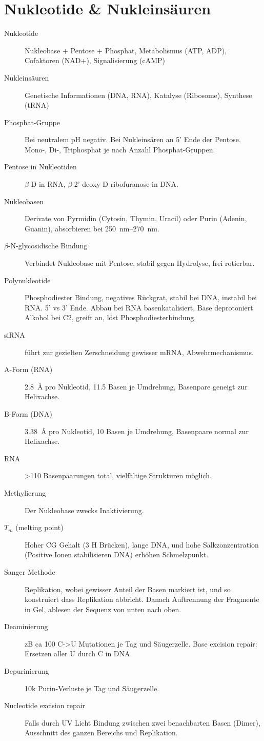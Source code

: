 \documentclass[a4paper,twocolumn,english,fontsize=7,DIV=16]{scrartcl}
\begin{document}
\section{Nukleotide \& Nukleinsäuren}

\begin{description}
	\item[Nukleotide] Nukleobase + Pentose + Phosphat, Metabolismus (ATP, ADP), Cofaktoren (NAD+), Signalisierung (cAMP)
	\item[Nukleinsäuren] Genetische Informationen (DNA, RNA), Katalyse (Ribosome), Synthese (tRNA)
	\item[Phosphat-Gruppe] Bei neutralem pH negativ. Bei Nukleinsären an 5'
		Ende der Pentose. Mono-, Di-, Triphosphat je nach Anzahl
		Phosphat-Gruppen.
	\item[Pentose in Nukleotiden] $\beta$-D in RNA, $\beta$-2'-deoxy-D
		ribofuranose in DNA.
	\item[Nukleobasen] Derivate von Pyrmidin (Cytosin, Thymin, Uracil) oder
		Purin (Adenin, Guanin), absorbieren bei
		\SIrange{250}{270}{\nm}.
	\item[$\beta$-N-glycosidische Bindung] Verbindet Nukleobase mit
		Pentose, stabil gegen Hydrolyse, frei rotierbar.
	\item[Polynukleotide] Phosphodiester Bindung, negatives Rückgrat,
		stabil bei DNA, instabil bei RNA. 5' vs 3' Ende. Abbau bei RNA
		basenkatalisiert, Base deprotoniert Alkohol bei C2, 
		greift  an, löst Phosphodiesterbindung.
	\item[siRNA] führt zur gezielten Zerschneidung gewisser mRNA,
		Abwehrmechanismus.
	\item[A-Form (RNA)] \SI{2.8}{\angstrom} pro Nukleotid, 11.5 Basen je
		Umdrehung, Basenpare geneigt zur Helixachse.
	\item[B-Form (DNA)] \SI{3.38}{\angstrom} pro Nukleotid, 10 Basen je
		Umdrehung, Basenpaare normal zur Helixachse.
	\item[RNA] >110 Basenpaarungen total, vielfältige Strukturen möglich.
	\item[Methylierung] Der Nukleobase zwecks Inaktivierung.
	\item[$T_m$ (melting point)] Hoher CG Gehalt (3 H Brücken), lange DNA,
		und hohe Salkzonzentration (Positive Ionen stabilisieren DNA)
		erhöhen Schmelzpunkt.
	\item[Sanger Methode] Replikation, wobei gewisser Anteil der Basen
		markiert ist, und so konstruiert dass Replikation abbricht.
		Danach Auftrennung der Fragmente in Gel, ablesen der Sequenz
		von unten nach oben.
	\item[Deaminierung] zB ca 100 C->U Mutationen je Tag und Säugerzelle.
		Base excision repair: Ersetzen aller U durch C in DNA.
	\item[Depurinierung] 10k Purin-Verluste je Tag und Säugerzelle.
	\item[Nucleotide excision repair] Falls durch UV Licht Bindung zwischen
		zwei benachbarten Basen (Dimer), Ausschnitt des ganzen Bereichs
		und Replikation.
\end{description}
\end{document}

